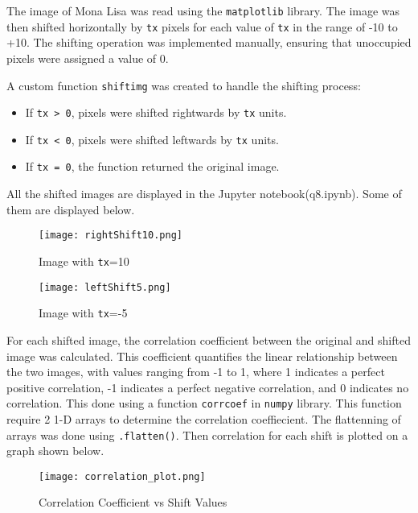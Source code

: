 \begin{tcolorbox}[breakable]
	\begin{sol}
		The image of Mona Lisa was read using the \texttt{matplotlib}
		library. The image was then shifted horizontally by \texttt{tx}
		pixels for each value of \texttt{tx} in the range of -10 to
		+10. The shifting operation was implemented manually, ensuring
		that unoccupied pixels were assigned a value of 0. 

		A custom function \texttt{shiftimg} was created to handle the shifting process:
		\begin{itemize}
			\item If \texttt{tx > 0}, pixels were shifted
			      rightwards by \texttt{tx} units.
			\item If \texttt{tx < 0}, pixels were shifted leftwards
			      by \texttt{tx} units.
			\item If \texttt{tx = 0}, the function returned the
			      original image.
		\end{itemize}
		All the shifted images are displayed in the Jupyter notebook(q8.ipynb). Some of them are displayed below.
		\begin{figure}[H]
			\centering
			\begin{minipage}{0.345\textwidth}
				\centering
				\texttt{[image: rightShift10.png]}
				\caption{Image with \texttt{tx}=10}
				\label{fig:rightShift}
			\end{minipage}
			\begin{minipage}{0.35\textwidth}
				\centering
				\texttt{[image: leftShift5.png]}
				\caption{Image with \texttt{tx}=-5}
				\label{fig:leftShift}
			\end{minipage}
		\end{figure}
		

		For each shifted image, the correlation coefficient between the
		original and shifted image was calculated. This coefficient
		quantifies the linear relationship between the two images, with
		values ranging from -1 to 1, where 1 indicates a perfect
		positive correlation, -1 indicates a perfect negative
		correlation, and 0 indicates no correlation. This done using a function \texttt{corrcoef} in \texttt{numpy} library. This function require 2 1-D arrays to determine the correlation coeffiecient. The flattenning of arrays was done using \texttt{.flatten()}.
		Then correlation for each shift is plotted on a graph shown below.  

		\begin{figure}[H]
			\centering
			\texttt{[image: correlation\_plot.png]}
			\caption{Correlation Coefficient vs Shift Values}
			\label{fig:corr_plot}
		\end{figure}



\end{sol}
\end{tcolorbox}

